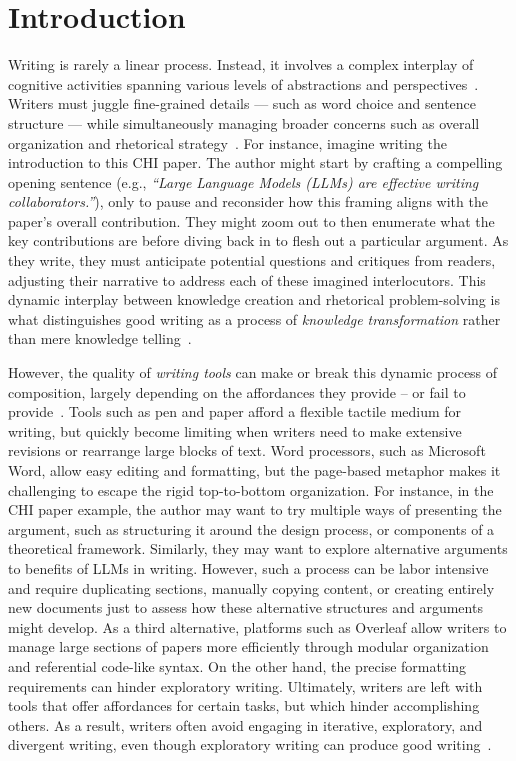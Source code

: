 \section{Introduction}
Writing is rarely a linear process. Instead, it involves a complex interplay of cognitive activities  spanning various levels of abstractions and perspectives~\cite{kellogg1999psychology, pea1987chapter}. Writers must juggle fine-grained details --- such as word choice and sentence structure --- while simultaneously managing broader concerns such as overall organization and rhetorical strategy~\cite{hayes2012modeling, hayes1980identifying}. For instance, imagine writing the introduction to this CHI paper. The author might start by crafting a compelling opening sentence (e.g., \textit{``Large Language Models (LLMs) are effective writing collaborators.''}), only to pause and reconsider how this framing aligns with the paper's overall contribution. They might zoom out to then enumerate  what the key contributions are before diving back in to flesh out a particular argument. As they write, they must anticipate potential questions and critiques from readers, adjusting their narrative to address each of these imagined interlocutors. This dynamic interplay between knowledge creation and rhetorical problem-solving is what distinguishes good writing as a process of \textit{knowledge transformation} rather than mere knowledge telling~\cite{bereiter1987psychology}. 

However, the quality of \textit{writing tools} can make or break this dynamic process of composition, largely depending on the affordances they provide -- or fail to provide~\cite{kozma1991computer, kellogg1999psychology}. Tools such as pen and paper afford a flexible tactile medium for writing, but quickly become limiting when writers need to make extensive revisions or rearrange large blocks of text. Word processors, such as Microsoft Word, allow easy editing and formatting, but the page-based metaphor makes it challenging to escape the rigid top-to-bottom organization. For instance, in the CHI paper example, the author may want to try multiple ways of presenting the argument, such as structuring it around the design process, or components of a theoretical framework. Similarly, they may want to explore alternative arguments to benefits of LLMs in writing. However, such a process can be labor intensive and require duplicating sections, manually copying content, or creating entirely new documents just to assess how these alternative structures and arguments might develop. As a third alternative, platforms such as Overleaf allow writers to manage large sections of papers more efficiently through modular organization and referential code-like syntax. On the other hand, the precise formatting requirements can hinder exploratory writing. Ultimately, writers are left with tools that offer affordances for certain tasks, but which hinder accomplishing others. As a result, writers often avoid engaging in iterative, exploratory, and divergent writing, even though exploratory writing \cite{elbow1998writing,bean2021engaging} can produce good writing~\cite{bereiter1987psychology}. 

